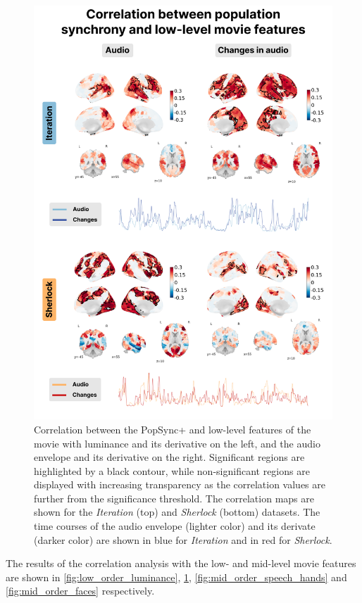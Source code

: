 \begin{figure}[!ht]
    \centering
    \includegraphics[width=0.7\linewidth]{figures/multi_subject/low_order_audio.png}
    \caption[]{Correlation between the PopSync+ and low-level features of the
    movie with luminance and its derivative on the left, and the audio envelope
    and its derivative on the right. Significant regions are highlighted by a
    black contour, while non-significant regions are displayed with increasing
    transparency as the correlation values are further from the significance
    threshold. The correlation maps are shown for the \textit{Iteration} (top)
    and \textit{Sherlock} (bottom) datasets. The time courses of the audio
    envelope (lighter color) and its derivate (darker color) are shown in blue
    for \textit{Iteration} and in red for \textit{Sherlock}.}
    \label{fig:low_order_audio}
\end{figure}

The results of the correlation analysis with the low- and mid-level movie
features are shown in \cref{fig:low_order_luminance},
\cref{fig:low_order_audio}, \cref{fig:mid_order_speech_hands} and
\cref{fig:mid_order_faces} respectively.

